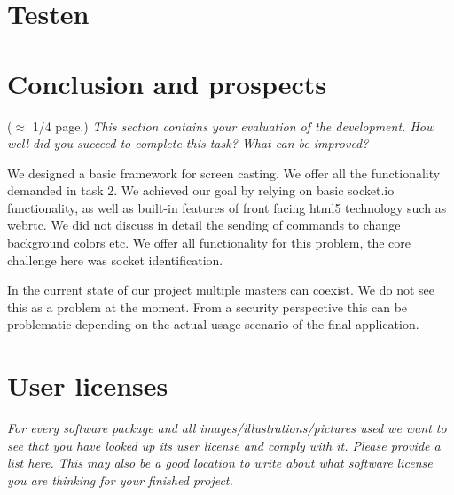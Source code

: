 \documentclass[a4paper,11pt]{article}
\newcommand{\note}[1]{{\colorbox{yellow!40!white}{#1}}}
\newcommand{\exampletext}[1]{{\color{blue!60!black}#1}}
\begin{document}
\section{Testen}

\section{Conclusion and prospects}\label{sec:conclusion}

\note{($\approx$ 1/4 page.)}
\exampletext{\textit{This section contains your evaluation of the development. How well did you succeed to complete this task? What can be improved?}}

\exampletext{We designed a basic framework for screen casting. We offer all the functionality demanded in task 2. We achieved our goal by relying on basic socket.io functionality, as well as built-in features of front facing html5 technology such as webrtc. We did not discuss in detail the sending of commands to change background colors etc. We offer all functionality for this problem, the core challenge here was socket identification.

In the current state of our project multiple masters can coexist. We do not see this as a problem at the moment. From a security perspective this can be problematic depending on the actual usage scenario of the final application.}


\appendix

\section{User licenses}

\exampletext{\textit{For every software package and all images/illustrations/pictures used we want to see that you have looked up its user license and comply with it. Please provide a list here. This may also be a good location to write about what software license you are thinking for your finished project.}}





\end{document}
